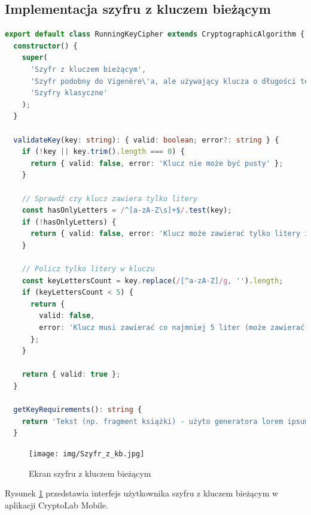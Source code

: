 \documentclass[12pt,a4paper]{article}
\begin{document}
\subsection{Implementacja szyfru z kluczem bieżącym}
\begin{lstlisting}[language=TypeScript, caption={Fragmenty klasy RunningKeyCipher}]
export default class RunningKeyCipher extends CryptographicAlgorithm {
  constructor() {
    super(
      'Szyfr z kluczem bieżącym',
      'Szyfr podobny do Vigenère\'a, ale używający klucza o długości tekstu',
      'Szyfry klasyczne'
    );
  }

  validateKey(key: string): { valid: boolean; error?: string } {
    if (!key || key.trim().length === 0) {
      return { valid: false, error: 'Klucz nie może być pusty' };
    }
    
    // Sprawdź czy klucz zawiera tylko litery
    const hasOnlyLetters = /^[a-zA-Z\s]+$/.test(key);
    if (!hasOnlyLetters) {
      return { valid: false, error: 'Klucz może zawierać tylko litery i spacje (A-Z, a-z)' };
    }
    
    // Policz tylko litery w kluczu
    const keyLettersCount = key.replace(/[^a-zA-Z]/g, '').length;
    if (keyLettersCount < 5) {
      return { 
        valid: false, 
        error: 'Klucz musi zawierać co najmniej 5 liter (może zawierać spacje)' 
      };
    }
    
    return { valid: true };
  }

  getKeyRequirements(): string {
    return 'Tekst (np. fragment książki) - użyto generatora lorem ipsum do stworzenia klucza';
  }
\end{lstlisting}
\begin{figure}[H]
    \centering
    \texttt{[image: img/Szyfr\_z\_kb.jpg]}
    \caption{Ekran szyfru z kluczem bieżącym}
    \label{fig:szyfrk}
\end{figure}

Rysunek \ref{fig:szyfrk} przedstawia interfejs użytkownika szyfru z kluczem bieżącym w aplikacji CryptoLab Mobile.

\newpage
\end{document}
